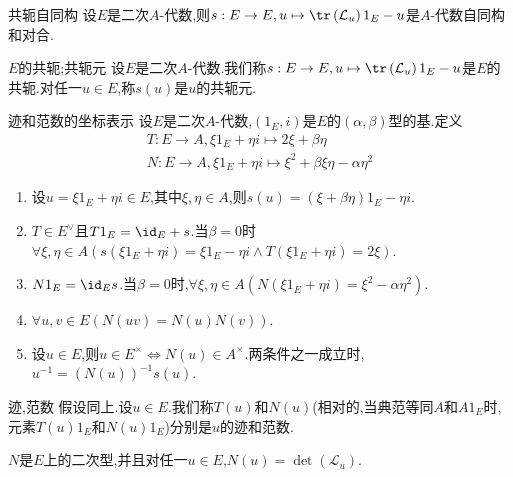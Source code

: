 \begin{proposition}{共轭自同构}{}
	设$E$是二次$A$-代数,则$s:E\to E,u\mapsto\tr\left(\mathcal{L}_{u}\right)1_{E}-u$是$A$-代数自同构和对合.
\end{proposition}

\begin{definition}{$E$的共轭;共轭元}{}
	设$E$是二次$A$-代数.我们称$s:E\to E,u\mapsto\tr\left(\mathcal{L}_{u}\right)1_{E}-u$是$E$的共轭.对任一$u\in E$,称$s\left(u\right)$是$u$的共轭元.
\end{definition}

\begin{proposition}{迹和范数的坐标表示}{}
	设$E$是二次$A$-代数,$\left(1_{E},i\right)$是$E$的$\left(\alpha,\beta\right)$型的基.定义
	\begin{gather*}
		T:E\to A,\xi 1_{E}+\eta i\mapsto 2\xi+\beta\eta\\
		N:E\to A,\xi 1_{E}+\eta i\mapsto \xi^{2}+\beta\xi\eta-\alpha\eta^{2}
	\end{gather*}
	\begin{enumerate}
		\item 设$u=\xi 1_{E}+\eta i\in E$,其中$\xi,\eta\in A$,则$s\left(u\right)=\left(\xi+\beta\eta\right)1_{E}-\eta i$.
		\item $T\in E^{\vee}$且$T1_{E}=\id_{E}+s$.当$\beta=0$时$\forall\xi,\eta\in A\left(s\left(\xi 1_{E}+\eta i\right)=\xi 1_{E}-\eta i\wedge T\left(\xi 1_{E}+\eta i\right)=2\xi\right)$.
		\item $N1_{E}=\id_{E}s$.当$\beta=0$时,$\forall\xi,\eta\in A\left(N\left(\xi 1_{E}+\eta i\right)=\xi^{2}-\alpha\eta^{2}\right)$.
		\item $\forall u,v\in E\left(N\left(uv\right)=N\left(u\right)N\left(v\right)\right)$.
		\item 设$u\in E$,则$u\in E^{\times}\iff N\left(u\right)\in A^{\times}$.两条件之一成立时,$u^{-1}=\left(N\left(u\right)\right)^{-1}s\left(u\right)$.
	\end{enumerate}
\end{proposition}

\begin{definition}{迹,范数}{}
	假设同上.设$u\in E$.我们称$T\left(u\right)$和$N\left(u\right)$(相对的,当典范等同$A$和$A1_{E}$时,元素$T\left(u\right)1_{E}$和$N\left(u\right)1_{E}$)分别是$u$的迹和范数.
\end{definition}

\begin{remark}{}{}
	$N$是$E$上的二次型,并且对任一$u\in E$,$N\left(u\right)=\det\left(\mathcal{L}_{u}\right)$.
\end{remark}

